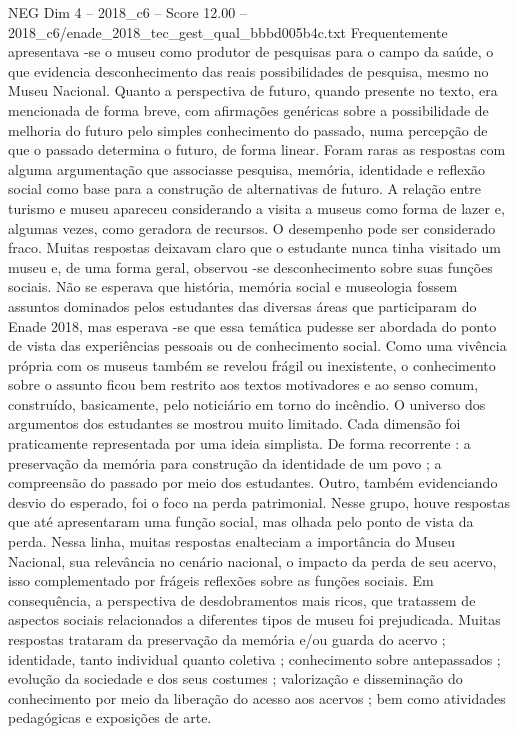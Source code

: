 \begin{textsample}{NEG Dim 4 – 2018\_c6 – Score 12.00 – 2018\_c6/enade\_2018\_tec\_gest\_qual\_bbbd005b4c.txt}
Frequentemente apresentava -se o museu como produtor de pesquisas para o campo da saúde, o que evidencia desconhecimento das reais possibilidades de pesquisa, mesmo no Museu Nacional.
Quanto a perspectiva de futuro, quando presente no texto, era mencionada de forma breve, com afirmações genéricas sobre a possibilidade de melhoria do futuro pelo simples conhecimento do passado, numa percepção de que o passado determina o futuro, de forma linear.
Foram raras as respostas com alguma argumentação que associasse pesquisa, memória, identidade e reflexão social como base para a construção de alternativas de futuro.
A relação entre turismo e museu apareceu considerando a visita a museus como forma de lazer e, algumas vezes, como geradora de recursos.
O desempenho pode ser considerado fraco.
Muitas respostas deixavam claro que o estudante nunca tinha visitado um museu e, de uma forma geral, observou -se desconhecimento sobre suas funções sociais.
Não se esperava que história, memória social e museologia fossem assuntos dominados pelos estudantes das diversas áreas que participaram do Enade 2018, mas esperava -se que essa temática pudesse ser abordada do ponto de vista das experiências pessoais ou de conhecimento social.
Como uma vivência própria com os museus também se revelou frágil ou inexistente, o conhecimento sobre o assunto ficou bem restrito aos textos motivadores e ao senso comum, construído, basicamente, pelo noticiário em torno do incêndio.
O universo dos argumentos dos estudantes se mostrou muito limitado.
Cada dimensão foi praticamente representada por uma ideia simplista.
De forma recorrente : a preservação da memória para construção da identidade de um povo ; a compreensão do passado por meio dos estudantes.
Outro, também evidenciando desvio do esperado, foi o foco na perda patrimonial.
Nesse grupo, houve respostas que até apresentaram uma função social, mas olhada pelo ponto de vista da perda.
Nessa linha, muitas respostas enalteciam a importância do Museu Nacional, sua relevância no cenário nacional, o impacto da perda de seu acervo, isso complementado por frágeis reflexões sobre as funções sociais.
Em consequência, a perspectiva de desdobramentos mais ricos, que tratassem de aspectos sociais relacionados a diferentes tipos de museu foi prejudicada.
Muitas respostas trataram da preservação da memória e/ou guarda do acervo ; identidade, tanto individual quanto coletiva ; conhecimento sobre antepassados ; evolução da sociedade e dos seus costumes ; valorização e disseminação do conhecimento por meio da liberação do acesso aos acervos ; bem como atividades pedagógicas e exposições de arte.

\end{textsample}
